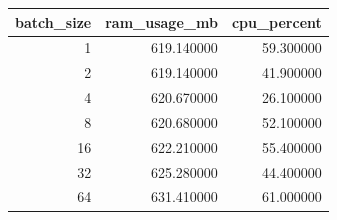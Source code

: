 \begin{tabular}{rrr}
\toprule
batch\_size & ram\_usage\_mb & cpu\_percent \\
\midrule
1 & 619.140000 & 59.300000 \\
2 & 619.140000 & 41.900000 \\
4 & 620.670000 & 26.100000 \\
8 & 620.680000 & 52.100000 \\
16 & 622.210000 & 55.400000 \\
32 & 625.280000 & 44.400000 \\
64 & 631.410000 & 61.000000 \\
\bottomrule
\end{tabular}
